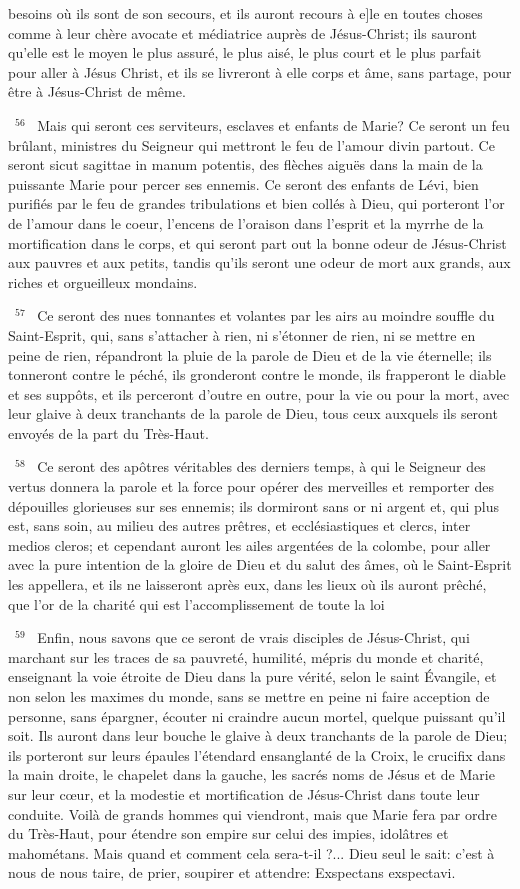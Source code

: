 \documentclass[paper=a5,pagesize=pdftex,fontsize=15pt,headinclude=on,twoside=off]{scrbook}
\newcommand{\negphantom}[1]{\settowidth{\dimen0}{#1}\hspace*{-\dimen0}}
\newcommand{\versenb}[1]{\par \vspace{10pt}~\negphantom{~${}^{#1}$~}${}^{#1}$~}
\begin{document}
besoins où ils sont de son secours, et ils auront recours à e]le en toutes choses comme à leur chère avocate et
médiatrice auprès de Jésus-Christ; ils sauront qu'elle est le moyen le plus assuré, le plus aisé, le plus court et le
plus parfait pour aller à Jésus Christ, et ils se livreront à elle corps et âme, sans partage, pour être à Jésus-Christ
de même.
\versenb{56} Mais qui seront ces serviteurs, esclaves et enfants de Marie?
Ce seront un feu brûlant, ministres du Seigneur qui mettront le feu de l'amour divin partout.
Ce seront sicut sagittae in manum potentis, des flèches aiguës dans la main de la puissante Marie pour percer ses
ennemis.
Ce seront des enfants de Lévi, bien purifiés par le feu de grandes tribulations et bien collés à Dieu, qui porteront
l'or de l'amour dans le coeur, l'encens de l'oraison dans l'esprit et la myrrhe de la mortification dans le corps, et qui
seront part out la bonne odeur de Jésus-Christ aux pauvres et aux petits, tandis qu'ils seront une odeur de mort
aux grands, aux riches et orgueilleux mondains.
\versenb{57} Ce seront des nues tonnantes et volantes par les airs au moindre souffle du Saint-Esprit, qui, sans s'attacher à
rien, ni s'étonner de rien, ni se mettre en peine de rien, répandront la pluie de la parole de Dieu et de la vie
éternelle; ils tonneront contre le péché, ils gronderont contre le monde, ils frapperont le diable et ses suppôts, et ils
perceront d'outre en outre, pour la vie ou pour la mort, avec leur glaive à deux tranchants de la parole de Dieu,
tous ceux auxquels ils seront envoyés de la part du Très-Haut.
\versenb{58} Ce seront des apôtres véritables des derniers temps, à qui le Seigneur des vertus donnera la parole et la force
pour opérer des merveilles et remporter des dépouilles glorieuses sur ses ennemis; ils dormiront sans or ni argent
et, qui plus est, sans soin, au milieu des autres prêtres, et ecclésiastiques et clercs, inter medios cleros; et
cependant auront les ailes argentées de la colombe, pour aller avec la pure intention de la gloire de Dieu et du
salut des âmes, où le Saint-Esprit les appellera, et ils ne laisseront après eux, dans les lieux où ils auront prêché,
que l'or de la charité qui est l'accomplissement de toute la loi
\versenb{59} Enfin, nous savons que ce seront de vrais disciples de Jésus-Christ, qui marchant sur les traces de sa
pauvreté, humilité, mépris du monde et charité, enseignant la voie étroite de Dieu dans la pure vérité, selon le saint
Évangile, et non selon les maximes du monde, sans se mettre en peine ni faire acception de personne, sans
épargner, écouter ni craindre aucun mortel, quelque puissant qu'il soit. Ils auront dans leur bouche le glaive à deux
tranchants de la parole de Dieu; ils porteront sur leurs épaules l'étendard ensanglanté de la Croix, le crucifix dans
la main droite, le chapelet dans la gauche, les sacrés noms de Jésus et de Marie sur leur cœur, et la modestie et
mortification de Jésus-Christ dans toute leur conduite.
Voilà de grands hommes qui viendront, mais que Marie fera par ordre du Très-Haut, pour étendre son empire sur
celui des impies, idolâtres et mahométans. Mais quand et comment cela sera-t-il ?... Dieu seul le sait: c'est à nous
de nous taire, de prier, soupirer et attendre: Exspectans exspectavi.
\end{document}
